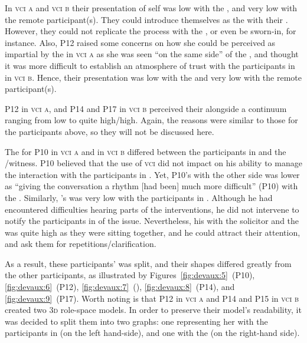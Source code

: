 \documentclass[output=paper]{langsci/langscibook}
\begin{document}
In \textsc{vci a} and \textsc{vci b} their presentation of self was low with the , and very low with the remote participant(s). They could introduce themselves as the  with their . However, they could not replicate the process with the , or even be sworn-in, for instance. Also, P12 raised some concerns on how she could be perceived as impartial by the  in \textsc{vci a} as she was seen “on the same side” of the , and  thought it was more difficult to establish an atmosphere of trust with the participants in  in \textsc{vci b}. Hence, their presentation was low with the  and very low with the remote participant(s).

P12 in \textsc{vci a}, and P14 and P17 in \textsc{vci b} perceived their  alongside a continuum ranging from low to quite high/high. Again, the reasons were similar to those for the participants above, so they will not be discussed here. 

The  for P10 in \textsc{vci a} and  in \textsc{vci b} differed between the participants in  and the /witness. P10 believed that the use of \textsc{vci}  did not impact on his ability to manage the interaction with the participants in . Yet, P10’s  with the other side was lower as “giving the conversation a rhythm [had been] much more difficult” (P10) with the . Similarly, ’s  was very low with the participants in . Although he had encountered difficulties hearing parts of the  interventions, he did not intervene to notify the participants in  of the issue. Nevertheless, his  with the solicitor and the  was quite high as they were sitting together, and he could attract their attention, and ask them for repetitions/clarification.

As a result, these participants’  was split, and their shapes differed greatly from the other participants, as illustrated by Figures~\ref{fig:devaux:5}~(P10), \ref{fig:devaux:6}~(P12), \ref{fig:devaux:7}~(), \ref{fig:devaux:8}~(P14), and \ref{fig:devaux:9}~(P17). Worth noting is that P12 in \textsc{vci a} and P14 and P15 in \textsc{vci b} created two \textsc{3d} role-space models. In order to preserve their model’s readability, it was decided to split them into two graphs: one representing her  with the participants in  (on the left hand-side), and one with the  (on the right-hand side).
\end{document}
